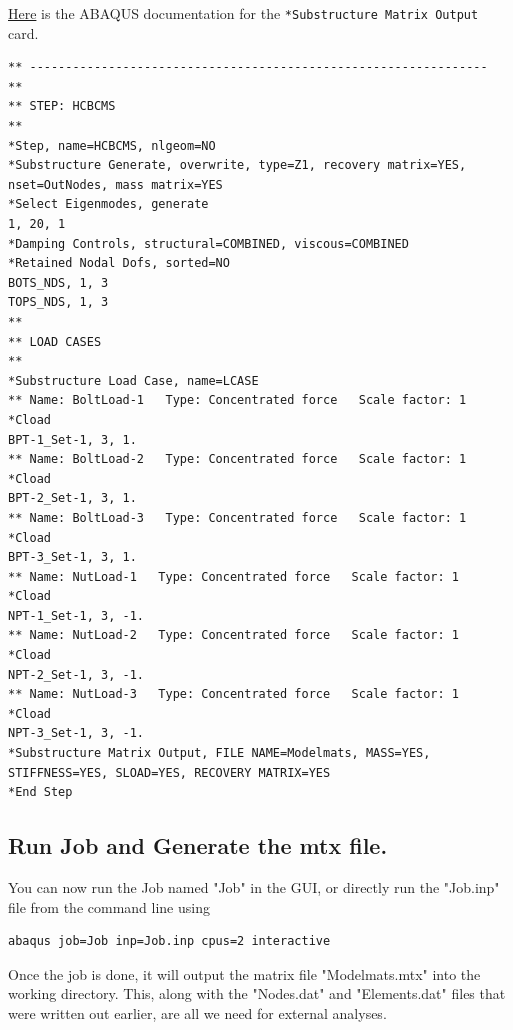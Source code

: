 \documentclass[11pt]{article}
\begin{document}
\begin{enumerate}
\href{https://classes.engineering.wustl.edu/2009/spring/mase5513/abaqus/docs/v6.6/books/key/default.htm?startat=ch18abk43.html}{Here} is the ABAQUS documentation for the \texttt{*Substructure Matrix Output} card.
\begin{verbatim}
** ----------------------------------------------------------------
** 
** STEP: HCBCMS
** 
*Step, name=HCBCMS, nlgeom=NO
*Substructure Generate, overwrite, type=Z1, recovery matrix=YES, nset=OutNodes, mass matrix=YES
*Select Eigenmodes, generate
1, 20, 1
*Damping Controls, structural=COMBINED, viscous=COMBINED
*Retained Nodal Dofs, sorted=NO
BOTS_NDS, 1, 3
TOPS_NDS, 1, 3
** 
** LOAD CASES
** 
*Substructure Load Case, name=LCASE
** Name: BoltLoad-1   Type: Concentrated force   Scale factor: 1
*Cload
BPT-1_Set-1, 3, 1.
** Name: BoltLoad-2   Type: Concentrated force   Scale factor: 1
*Cload
BPT-2_Set-1, 3, 1.
** Name: BoltLoad-3   Type: Concentrated force   Scale factor: 1
*Cload
BPT-3_Set-1, 3, 1.
** Name: NutLoad-1   Type: Concentrated force   Scale factor: 1
*Cload
NPT-1_Set-1, 3, -1.
** Name: NutLoad-2   Type: Concentrated force   Scale factor: 1
*Cload
NPT-2_Set-1, 3, -1.
** Name: NutLoad-3   Type: Concentrated force   Scale factor: 1
*Cload
NPT-3_Set-1, 3, -1.
*Substructure Matrix Output, FILE NAME=Modelmats, MASS=YES, STIFFNESS=YES, SLOAD=YES, RECOVERY MATRIX=YES
*End Step
\end{verbatim}
\end{enumerate}
\subsection{Run Job and Generate the mtx file.}
\label{sec:orgbc3a51c}
You can now run the Job named "Job" in the GUI, or directly run the "Job.inp" file from the command line using
\begin{verbatim}
abaqus job=Job inp=Job.inp cpus=2 interactive
\end{verbatim}
Once the job is done, it will output the matrix file "Modelmats.mtx" into the working directory.
This, along with the "Nodes.dat" and "Elements.dat" files that were written out earlier, are all we need for external analyses.
\end{document}
